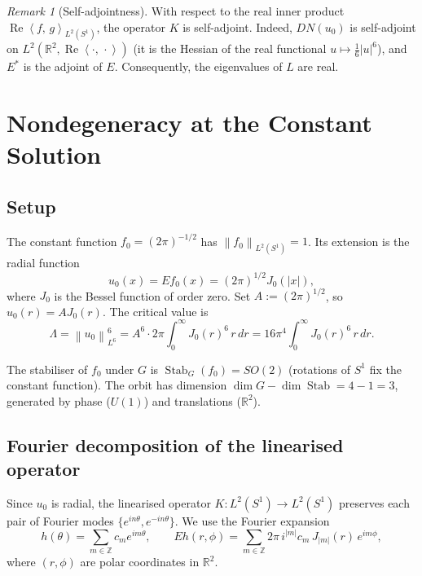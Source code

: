 \documentclass[12pt]{article}
\theoremstyle{definition}
\theoremstyle{remark}
\newtheorem{remark}[theorem]{Remark}
\DeclareMathOperator{\Stab}{Stab}
\newcommand{\R}{\mathbb{R}}
\newcommand{\Z}{\mathbb{Z}}
\newcommand{\norm}[1]{\left\|#1\right\|}
\newcommand{\ip}[2]{\left\langle #1,\, #2\right\rangle}
\newcommand{\re}{\operatorname{Re}}
\begin{document}
\begin{remark}[Self-adjointness]
  With respect to the real inner product
  $\re\ip{f}{g}_{L^2(S^1)}$, the operator $K$ is self-adjoint.
  Indeed, $DN(u_0)$ is self-adjoint on $L^2(\R^2,\re\ip{\cdot}{\cdot})$
  (it is the Hessian of the real functional $u\mapsto\tfrac{1}{6}|u|^6$),
  and $E^*$ is the adjoint of $E$.  Consequently, the eigenvalues of $L$
  are real.
\end{remark}

\section{Nondegeneracy at the Constant Solution}
\label{sec:nondeg}

\subsection{Setup}

The constant function $f_0=(2\pi)^{-1/2}$ has $\norm{f_0}_{L^2(S^1)}=1$.
Its extension is the radial function
\[
  u_0(x) = Ef_0(x) = (2\pi)^{1/2}J_0(|x|),
\]
where $J_0$ is the Bessel function of order zero.  Set $A:=(2\pi)^{1/2}$, so
$u_0(r)=AJ_0(r)$.  The critical value is
\[
  \Lambda = \norm{u_0}_{L^6}^6
  = A^6\cdot 2\pi\int_0^\infty J_0(r)^6\,r\,dr
  = 16\pi^4\int_0^\infty J_0(r)^6\,r\,dr.
\]

The stabiliser of $f_0$ under $G$ is $\Stab_G(f_0)=SO(2)$ (rotations of
$S^1$ fix the constant function).  The orbit has dimension
$\dim G-\dim\Stab=4-1=3$, generated by phase ($U(1)$) and translations
($\R^2$).

\subsection{Fourier decomposition of the linearised operator}

Since $u_0$ is radial, the linearised operator
$K:L^2(S^1)\to L^2(S^1)$ preserves each pair of Fourier modes
$\{e^{in\theta},e^{-in\theta}\}$.  We use the Fourier expansion
\[
  h(\theta)=\sum_{m\in\Z}c_m e^{im\theta},
  \qquad
  Eh(r,\phi)=\sum_{m\in\Z} 2\pi\,i^{|m|}c_m\,J_{|m|}(r)\,e^{im\phi},
\]
where $(r,\phi)$ are polar coordinates in $\R^2$.
\end{document}
